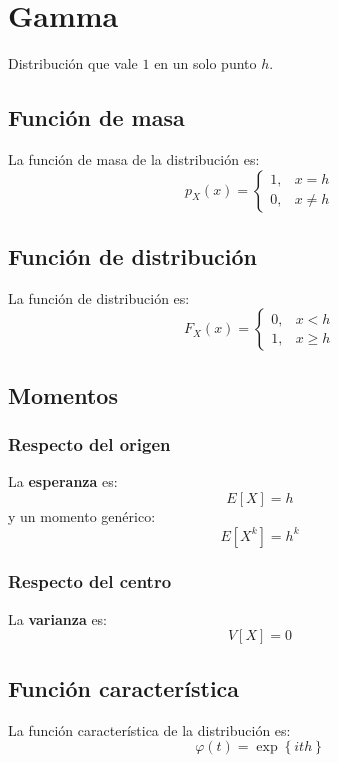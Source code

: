 \section{Gamma}
\label{sec:gamma}
Distribución que vale $1$ en un solo punto $h$.

\subsection{Función de masa}
La función de masa de la distribución es:
\[
p_X \left( x \right) = \begin{cases}
    1, &x = h\\
    0, &x \neq h
\end{cases}
\]

\subsection{Función de distribución}
La función de distribución es:
\[
F_X\left( x \right) = \begin{cases}
    0, &x < h\\ 
    1, &x \ge h
\end{cases}
\]

\subsection{Momentos}

\subsubsection*{Respecto del origen}
La \textbf{esperanza} es: 
\[
    E\left[ X \right] = h
\]
y un momento genérico: 
\[
    E\left[ X^k \right] = h^k
\]
\subsubsection*{Respecto del centro}
La \textbf{varianza} es:
\[
    V\left[ X \right] = 0
\]

\subsection{Función característica}
La función característica de la distribución es:
\[
\varphi\left( t \right) = \exp\left\{ ith \right\}
\]

